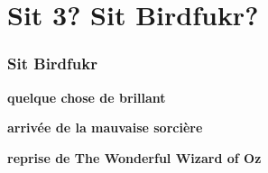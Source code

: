 \chapter*{Sit 3? Sit Birdfukr?}

\subsection*{Sit Birdfukr}
\begin{center}\textbf{quelque chose de brillant}\end{center}

\begin{center}\textbf{arrivée de la mauvaise sorcière}\end{center}
\begin{center}\textbf{reprise de The Wonderful Wizard of Oz}\end{center}
